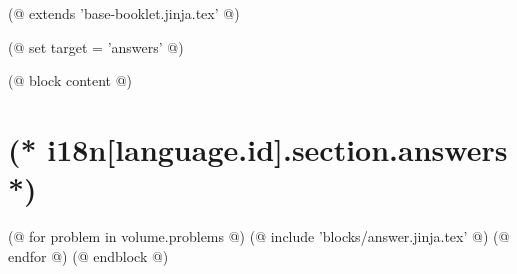 (@ extends 'base-booklet.jinja.tex' @)

(@ set target = 'answers' @)

(@ block content @)
    \section{(* i18n[language.id].section.answers *)}
    \pagestyle{answers}
    (@ for problem in volume.problems @)%
        (@ include 'blocks/answer.jinja.tex' @)%
    (@ endfor @)
(@ endblock @)
